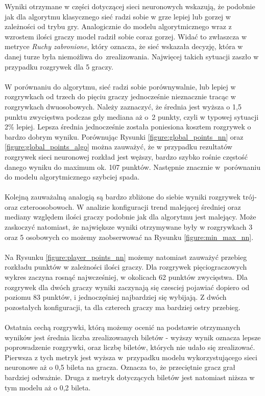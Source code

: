 \documentclass[12pt, oneside]{report}
\begin{document}
Wyniki otrzymane w części dotyczącej sieci neuronowych wskazują, że podobnie jak dla algorytmu klasycznego sieć radzi sobie w grze lepiej lub gorzej w zależności od trybu gry. Analogicznie do modelu algorytmicznego wraz z wzrostem ilości graczy model radził sobie coraz gorzej. Widać to zwłaszcza w metryce \textit{Ruchy zabronione}, który oznacza, że sieć wskazała decyzję, która w danej turze była niemożliwa do~zrealizowania. Najwięcej takich sytuacji zaszło w przypadku rozgrywek dla 5 graczy. \\ \\
W porównaniu do algorytmu, sieć radzi sobie porównywalnie, lub lepiej w rozgrywkach od trzech do pięciu graczy jednocześnie nieznacznie tracąc w rozgrywkach dwuosobowych. Należy zaznaczyć, że średnia jest wyższa o 1,5 punktu zwycięstwa podczas gdy mediana aż o~2 punkty, czyli w typowej sytuacji 2\% lepiej. Lepsza średnia jednocześnie została poniesiona kosztem rozgrywek o bardzo dobrym wyniku. Porównując Rysunki \ref{figure:global_points_nn} oraz \ref{figure:global_points_algo} można zauważyć, że w przypadku rezultatów rozgrywek sieci neuronowej rozkład jest węższy, bardzo szybko rośnie częstość danego wyniku do maximum ok. 107 punktów. Następnie znacznie w~porównaniu do modelu algorytmicznego szybciej spada. \\ \\
Kolejną zauważalną analogią są bardzo zbliżone do siebie wyniki rozgrywek trój- oraz czteroosobowoch. W analizie konfiguracji trend malejącej średniej oraz mediany względem ilości graczy podobnie jak dla algorytmu jest malejący. Może zaskoczyć natomiast, że największe wyniki otrzymywane były w rozgrywkach 3 oraz 5 osobowych co możemy zaobserwować na Rysunku \ref{figure:min_max_nn}. \\ \\
Na Rysunku \ref{figure:player_points_nn} możemy natomiast zauważyć przebieg rozkładu punktów w zależności ilości graczy. Dla rozgrywek pięciograczowych wykres zaczyna rosnąć najwcześniej, w okolicach 62 punktów zwycięstwa. Dla rozgrywek dla dwóch graczy wyniki zaczynają się czesciej pojawiać dopiero od poziomu 83 punktów, i jednoczęśniej najbardziej się wybijają. Z dwóch pozostałych konfiguracji, ta dla czterech graczy ma bardziej ostry przebieg. \\ \\
Ostatnia cechą rozgrywki, którą możemy ocenić na podstawie otrzymanych wyników jest średnia liczba zrealizowanych biletów - wyższy wynik oznacza lepsze poprowadzenie rozgrywki, oraz liczbę biletów, których nie udało się zrealizować. Pierwsza z tych metryk jest wyższa w~przypadku modelu wykorzystującego sieci neuronowe aż o 0,5 bileta na gracza. Oznacza to, że przeciętnie gracz grał bardziej odważnie. Druga z metryk dotyczących biletów jest natomiast niższa w tym modelu aż o 0,2 bileta. 
\end{document}

